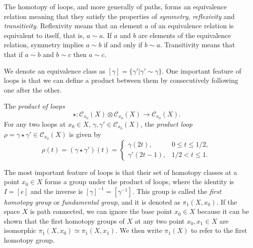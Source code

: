 The homotopy of loops, and more generally of paths, forms an equivalence relation meaning that they satisfy the properties of \textit{symmetry}, \textit{reflexivity} and \textit{transitivity}. %
Reflexivity means that an element $a$ of an equivalence relation is equivalent to itself, that is, $a\sim a$. If $a$ and $b$ are elements of the equivalence relation, symmetry implies $a\sim b$ if and only if $b\sim a$. Transitivity means that that if $a\sim b$ and $b\sim c$ then $a\sim c$.


We denote an equivalence class as $[\gamma] = \{\gamma' | \gamma' \sim \gamma \}$. One important feature of loops is that we can define a product between them by consecutively following one after the other.
\begin{definition} The \textit{product of loops}
\begin{equation}
	\star: \mathscr{C}_{x_0}(X)\otimes \mathscr{C}_{x_0}(X) \to \mathscr{C}_{x_0}(X).
\end{equation}
For any two loops at $x_0\in X$, $\gamma, \gamma' \in \mathscr{C}_{x_0}(X)$, the \textit{product loop} $\rho = \gamma \star \gamma' \in \mathscr{C}_{x_0}(X)$ is given by
\begin{equation}
	\rho(t) = (\gamma \star \gamma') (t)= \begin{cases} 
              	\gamma(2t), & 0\leq t \leq 1/2,\\
              	\gamma'(2t-1),&  1/2 < t \leq 1.
	          \end{cases}
\end{equation}
\end{definition}
The most important feature of loops is that their set of homotopy classes at a point $x_0\in X$ forms a group under the product of loops, where the identity is $I=[e]$ and the inverse is $[\gamma]^{-1}=[\gamma^{-1}]$. This group is called the \textit{first homotopy group} or \textit{fundamental group}, and it is denoted as $\pi_1(X,x_0)$. If the space $X$ is path connected, we can ignore the base point $x_0\in X$ because it can be shown that the first homotopy groups of $X$ at any two point $x_0,x_1\in X$ are isomorphic $\pi_1(X,x_0)\simeq \pi_1(X,x_1)$. We then write $\pi_1(X)$ to refer to the first homotopy group.

